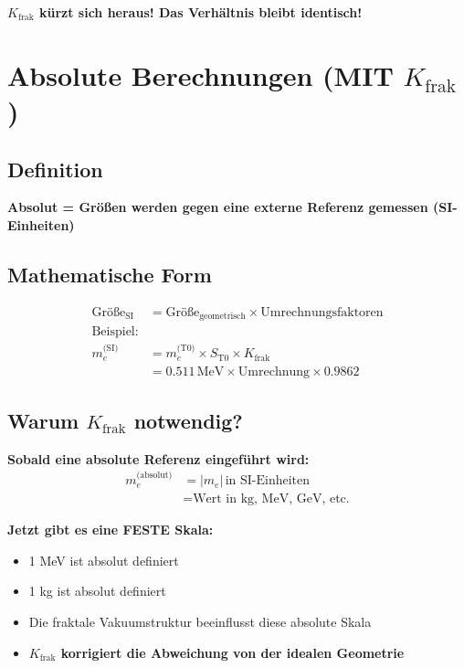 	\textbf{$K_{\text{frak}}$ kürzt sich heraus! Das Verhältnis bleibt identisch!}
	
	\section{Absolute Berechnungen (MIT $K_{\text{frak}}$)}
	
	\subsection{Definition}
	
	\textbf{Absolut = Größen werden gegen eine externe Referenz gemessen (SI-Einheiten)}
	
	\subsection{Mathematische Form}
	\begin{align*}
		\text{Größe}_{\text{SI}} &= \text{Größe}_{\text{geometrisch}} \times \text{Umrechnungsfaktoren} \\
		\text{Beispiel:} & \\
		m_e^{\text{(SI)}} &= m_e^{\text{(T0)}} \times S_{\text{T0}} \times K_{\text{frak}} \\
		&= 0.511\,\text{MeV} \times \text{Umrechnung} \times 0.9862
	\end{align*}
	
	\subsection{Warum $K_{\text{frak}}$ notwendig?}
	
	\textbf{Sobald eine absolute Referenz eingeführt wird:}
	\begin{align*}
		m_e^{\text{(absolut)}} &= |m_e|\,\text{in SI-Einheiten} \\
		&= \text{Wert in kg, MeV, GeV, etc.}
	\end{align*}
	
	\textbf{Jetzt gibt es eine FESTE Skala:}
	\begin{itemize}
		\item 1 MeV ist absolut definiert
		\item 1 kg ist absolut definiert  
		\item Die fraktale Vakuumstruktur beeinflusst diese absolute Skala
		\item \textbf{$K_{\text{frak}}$ korrigiert die Abweichung von der idealen Geometrie}
	\end{itemize}
	
